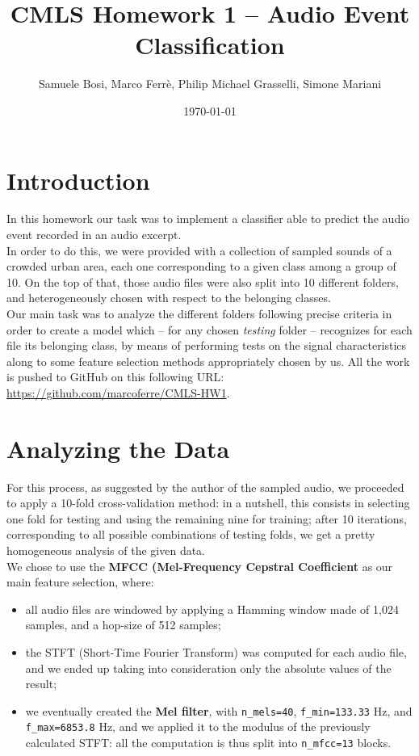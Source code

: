 \documentclass[11pt]{article}
\author{Samuele Bosi, Marco Ferrè, Philip Michael Grasselli, Simone Mariani}
\title{\textbf{CMLS Homework 1 – Audio Event Classification}}
\date{\today}
\begin{document}
\maketitle
\tableofcontents

\section{Introduction}
In this homework our task was to implement a classifier able to predict the audio event recorded in an audio excerpt.\\
In order to do this, we were provided with a collection of sampled sounds of a crowded urban area, each one corresponding to a given class among a group of 10. On the top of that, those audio files were also split into 10 different folders, and heterogeneously chosen with respect to the belonging classes.\\
Our main task was to analyze the different folders following precise criteria in order to create a model which -- for any chosen \textit{testing} folder -- recognizes for each file its belonging class, by means of performing tests on the signal characteristics along to some feature selection methods appropriately chosen by us.
All the work is pushed to GitHub on this following URL: \url{https://github.com/marcoferre/CMLS-HW1}.

\section{Analyzing the Data}

For this process, as suggested by the author of the sampled audio, we proceeded to apply a 10-fold cross-validation method: in a nutshell, this consists in selecting one fold for testing and using the remaining nine for training; after 10 iterations, corresponding to all possible combinations of testing folds, we get a pretty homogeneous analysis of the given data.\\
We chose to use the \textbf{MFCC (Mel-Frequency Cepstral Coefficient} as our main feature selection, where:
\begin{itemize}
\item all audio files are windowed by applying a Hamming window made of 1,024 samples, and a hop-size of 512 samples;
\item the STFT (Short-Time Fourier Transform) was computed for each audio file, and we ended up taking into consideration only the absolute values of the result;
\item we eventually created the \textbf{Mel filter}, with \texttt{n{\_}mels=40}, \texttt{f{\_}min=133.33} Hz, and \texttt{f{\_}max=6853.8} Hz, and we applied it to the modulus of the previously calculated STFT: all the computation is thus split into \texttt{n{\_}mfcc=13} blocks.
\end{itemize}
\end{document}
